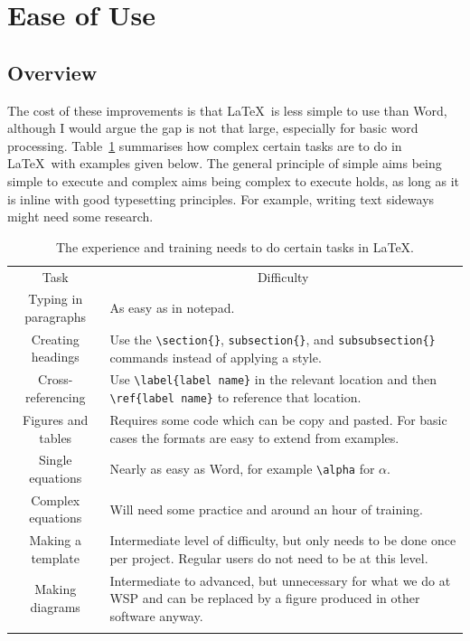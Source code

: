 \section{Ease of Use}
\label{sec:EaseOfUse}

\subsection{Overview}
\label{subsec:Overview}

The cost of these improvements is that \LaTeX\ is less simple to use than Word, although I would argue the gap is not that large, especially for basic word processing. Table~\ref{tab:Difficulty} summarises how complex certain tasks are to do in \LaTeX\ with examples given below. The general principle of simple aims being simple to execute and complex aims being complex to execute holds, as long as it is inline with good typesetting principles. For example, writing text sideways might need some research.

\begin{table}[H]
	\caption{The experience and training needs to do certain tasks in \LaTeX.}
	\label{tab:Difficulty}
	\centering
	\begin{tabular}{cp{110 mm}}
		\myhline
		Task & \multicolumn{1}{c}{Difficulty}  \\
		\myhline
		Typing in paragraphs & As easy as in notepad.  \\
		Creating headings & Use the \Verb_\section{}_, \Verb_subsection{}_, and \Verb_subsubsection{}_ commands instead of applying a style.  \\
		Cross-referencing & Use \Verb_\label{label name}_ in the relevant location and then \Verb_\ref{label name}_ to reference that location.  \\
		Figures and tables & Requires some code which can be copy and pasted. For basic cases the formats are easy to extend from examples.  \\
		Single equations & Nearly as easy as Word, for example \Verb_\alpha_ for $\alpha$.  \\
		Complex equations & Will need some practice and around an hour of training.  \\
		Making a template & Intermediate level of difficulty, but only needs to be done once per project. Regular users do not need to be at this level.  \\
		Making diagrams & Intermediate to advanced, but unnecessary for what we do at WSP and can be replaced by a figure produced in other software anyway.  \\
		\myhline
	\end{tabular}
\end{table}

